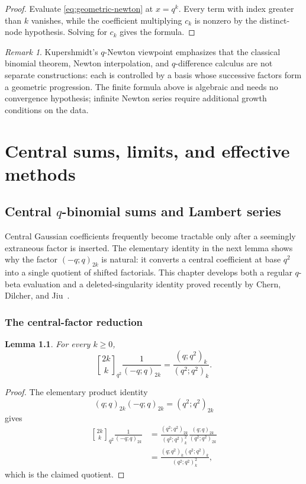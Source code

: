 \documentclass[11pt,oneside,openany]{book}
\newtheorem{lemma}[lemma]{Lemma}
\theoremstyle{definition}
\theoremstyle{remark}
\newtheorem{remark}[remark]{Remark}
\newcommand{\Qbinom}[3]{\genfrac{[}{]}{0pt}{}{#1}{#2}_{#3}}
\begin{document}
\begin{proof}
Evaluate \eqref{eq:geometric-newton} at $x=q^k$.  Every term with index greater than $k$ vanishes, while the coefficient multiplying $c_k$ is nonzero by the distinct-node hypothesis.  Solving for $c_k$ gives the formula.
\end{proof}

\begin{remark}
Kupershmidt's $q$-Newton viewpoint emphasizes that the classical binomial theorem, Newton interpolation, and $q$-difference calculus are not separate constructions: each is controlled by a basis whose successive factors form a geometric progression.  The finite formula above is algebraic and needs no convergence hypothesis; infinite Newton series require additional growth conditions on the data.
\end{remark}

\part{Central sums, limits, and effective methods}

\chapter{Central \texorpdfstring{$q$}{q}-binomial sums and Lambert series}\label{chap:central}

Central Gaussian coefficients frequently become tractable only after a seemingly extraneous factor is inserted.  The elementary identity in the next lemma shows why the factor $(-q;q)_{2k}$ is natural: it converts a central coefficient at base $q^2$ into a single quotient of shifted factorials.  This chapter develops both a regular $q$-beta evaluation and a deleted-singularity identity proved recently by Chern, Dilcher, and Jiu~\cite{ChernDilcherJiu2026}.

\section{The central-factor reduction}

\begin{lemma}\label{lem:central-reduction}
For every $k\ge0$,
\[
 \Qbinom{2k}{k}{q^2}\frac1{(-q;q)_{2k}}
 =\frac{(q;q^2)_k}{(q^2;q^2)_k}.
 \tag{18.1}\label{eq:central-reduction}
\]
\end{lemma}

\begin{proof}
The elementary product identity
\[
 (q;q)_{2k}(-q;q)_{2k}=(q^2;q^2)_{2k}
\]
gives
\begin{align*}
 \Qbinom{2k}{k}{q^2}\frac1{(-q;q)_{2k}}
 &=\frac{(q^2;q^2)_{2k}}{(q^2;q^2)_k^2}
   \frac{(q;q)_{2k}}{(q^2;q^2)_{2k}}\\
 &=\frac{(q;q^2)_k(q^2;q^2)_k}{(q^2;q^2)_k^2},
\end{align*}
which is the claimed quotient.
\end{proof}
\end{document}
